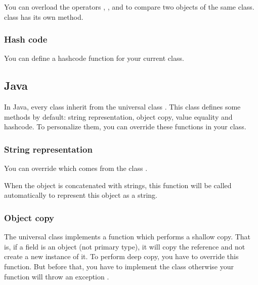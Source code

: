\documentclass{KodeBook}
\begin{document}
You can overload the operators \keyword{>}, \keyword{<}, \keyword{>=} and \keyword{<=} to compare two objects of the same class.  
 class has its own  method.



\subsubsection{Hash code}

You can define a hashcode function for your current class.

\subsection{Java}

In Java, every class inherit from the universal class . 
This class defines some methods by default: string representation, object copy, value equality and hashcode.
To personalize them, you can override these functions in your class.

\subsubsection{String representation}

You can override  which comes from the class .   



When the object is concatenated with strings, this function will be called automatically to represent this object as a string.



\subsubsection{Object copy}

The universal class  implements a function  which performs a shallow copy.
That is, if a field is an object (not primary type), it will copy the reference and not create a new instance of it. 
To perform deep copy, you have to override this function. 
But before that, you have to implement the class  otherwise your function will throw an exception .
\end{document}
